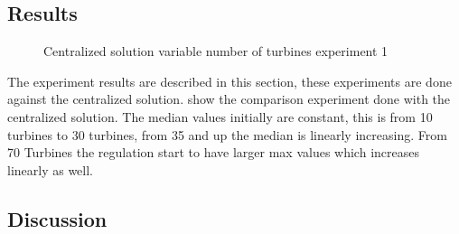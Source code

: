 \subsection{Results}

\begin{figure}[h!]
	\centering
	
	\caption{Centralized solution variable number of turbines experiment 1}
	\label{fig:exp:cen:turbines}
\end{figure}

The  experiment results are described in this section, these experiments are done against the centralized solution.  show the comparison experiment done with the centralized solution. The median values initially are constant, this is from 10 turbines to 30 turbines, from 35 and up the median is linearly increasing.
From 70 Turbines the regulation start to have larger max values which increases linearly as well.





\subsection{Discussion}




